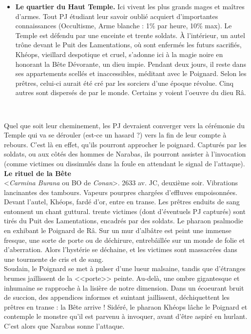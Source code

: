 \documentclass[11pt,twoside,a4paper]{book}
\begin{document}
\begin{itemize}
	\item \textbf{Le quartier du Haut Temple. }Ici vivent les plus grands mages et ma{\^i}tres d'armes. Tout PJ {\'e}tudiant leur savoir oubli{\'e} acquiert d'importantes connaissances (Occultisme, Arme blanche : 1\% par heure, 10\% max). Le Temple est d{\'e}fendu par une enceinte et trente soldats. {\`A} l'int{\'e}rieur, un autel tr{\^o}ne devant le Puit des Lamentations, o{\`u} sont enferm{\'e}s les futurs sacrifi{\'e}s, Kh{\'e}ops, vieillard despotique et cruel, s'adonne ici {\`a} la magie noire en honorant la B{\^e}te D{\'e}vorante, un dieu impie. Pendant deux jours, il reste dans ses appartements scell{\'e}s et inaccessibles, m{\'e}ditant avec le Poignard. Selon les pr{\^e}tres, celui-ci aurait {\'e}t{\'e} cr{\'e} par les sorciers d'une {\'e}poque r{\'e}volue. Cinq autres sont dispers{\'e}s de par le monde. Certains y voient l'oeuvre du dieu R{\^a}.
\end{itemize}~\\
\setlength\parindent{0pt}

Quel que soit leur cheminement, les PJ devraient converger vers la c{\'e}r{\'e}monie du Temple qui va se d{\'e}rouler (est-ce un hasard ?) vers la fin de leur compte {\`a} rebours. C'est l{\`a} en effet, qu'ils pourront approcher le poignard. Captur{\'e}s par les soldats, ou aux c{\^o}t{\'e}s des hommes de Narabas, ils pourront assister {\`a} l'invocation (comme victimes ou dissimul{\'e}s dans la foule en attendant le signal de l'attaque).~\\

\textbf{\large Le rituel de la B{\^e}te}~\\

<\emph{Carmina Burana} ou BO de \emph{Conan}>. 2633 av. JC, deuxi{\`e}me soir. Vibrations lancinantes des tambours. Vapeurs pourpres charg{\'e}es d'effluves empoisonn{\'e}es. Devant l'autel, Kh{\'e}ops, fard{\'e} d'or, entre en transe. Les pr{\^e}tres enduits de sang entonnent un chant guttural. trente victimes (dont d'{\'e}ventuels PJ captur{\'e}s) sont tir{\'e}s du Puit des Lamentations, encadr{\'e}s par des soldats. Le pharaon psalmodie en exhibant le Poignard de R{\^a}. Sur un mur d'alb{\^a}tre est peint une immense fresque, une sorte de porte ou de d{\'e}chirure, entreb{\^a}ill{\'e}e sur un monde de folie et d'aberration. Alors l'hyst{\'e}rie se d{\'e}chaine, et les victimes sont massacr{\'e}es dans une tourmente de cris et de sang.~\\

Soudain, le Poignard se met {\`a} pulser d'une lueur malsaine, tandis que d'{\'e}tranges brumes jaillissent de la <<porte>> peinte. Au-del{\`a}, une ombre gigantesque et inhumaine se rapproche {\`a} la lisi{\`e}re de notre dimension. Dans un {\'e}coeurant bruit de succion, des appendices informes et suintant jaillissent, d{\'e}chiquettent les pr{\^e}tres en transe : la B{\^e}te arrive ! Sid{\'e}r{\'e}, le pharaon Kh{\'e}ops l{\^a}che le Poignard et contemple le monstre qu'il est parvenu {\`a} invoquer, avant d'{\^e}tre aspir{\'e} en hurlant. C'est alors que Narabas sonne l'attaque.~\\
\end{document}
